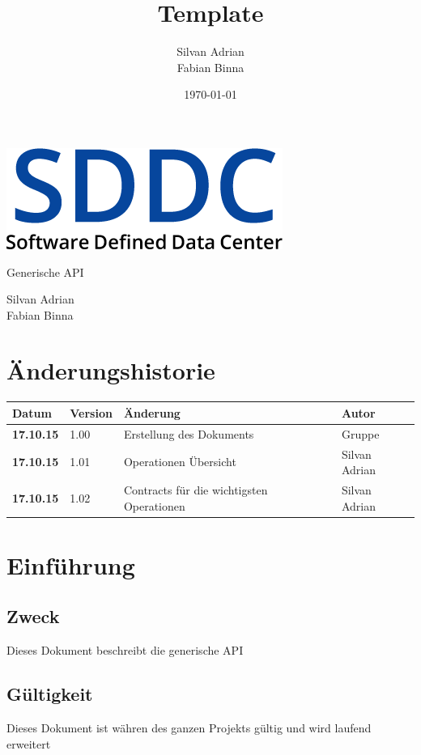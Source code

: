 \documentclass[11pt]{scrartcl}
\title{Template}
\author{Silvan Adrian \\ Fabian Binna}
\date{\today{}}
\begin{document}
\def\arraystretch{1.5}
\begin{titlepage}
\begin{center}
\vspace{10em}
\includegraphics[scale=2]{SDDC}
\vspace{10em}
\end{center}
\begin{center}
\huge {Generische API}
\end{center}
\begin{center}
\vspace{10em}
\LARGE {Silvan Adrian} \\
\LARGE {Fabian Binna}
\end{center}

\end{titlepage}

\newpage
\section{Änderungshistorie}
\begin{tabularx}{\linewidth}{l l X l}
\textbf{Datum} & \textbf{Version} & \textbf{Änderung}  & \textbf{Autor} \\
\hline
\textbf{17.10.15} & 1.00 & Erstellung des Dokuments & Gruppe \\
\textbf{17.10.15} & 1.01 & Operationen Übersicht & Silvan Adrian \\
\textbf{17.10.15} & 1.02 & Contracts für die wichtigsten Operationen & Silvan Adrian \\
\end{tabularx}

\newpage
\tableofcontents
\newpage
\section{Einführung}
\subsection{Zweck}
Dieses Dokument beschreibt die generische API
\subsection{Gültigkeit}
Dieses Dokument ist währen des ganzen Projekts gültig und wird laufend erweitert
\end{document}
